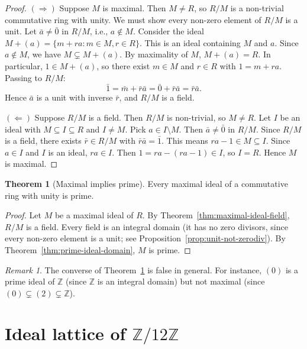 \documentclass[12pt,a4paper,openany]{book}
\theoremstyle{definition}
\newtheorem{theorem}{Theorem}[chapter]
\theoremstyle{remark}
\newtheorem{remark}{Remark}[chapter]
\begin{document}
\begin{proof}
$(\Rightarrow)$ Suppose $M$ is maximal. Then $M\neq R$, so $R/M$ is a non-trivial commutative ring with unity. We must show every non-zero element of $R/M$ is a unit. Let $\bar{a}\neq\bar{0}$ in $R/M$, i.e., $a\notin M$. Consider the ideal $M+(a)=\{m+ra : m\in M, r\in R\}$. This is an ideal containing $M$ and $a$. Since $a\notin M$, we have $M\subsetneq M+(a)$. By maximality of $M$, $M+(a)=R$. In particular, $1\in M+(a)$, so there exist $m\in M$ and $r\in R$ with $1=m+ra$. Passing to $R/M$:
\[
    \bar{1}=\bar{m}+\bar{r}\bar{a}=\bar{0}+\bar{r}\bar{a}=\bar{r}\bar{a}.
\]
Hence $\bar{a}$ is a unit with inverse $\bar{r}$, and $R/M$ is a field.

$(\Leftarrow)$ Suppose $R/M$ is a field. Then $R/M$ is non-trivial, so $M\neq R$. Let $I$ be an ideal with $M\subseteq I\subseteq R$ and $I\neq M$. Pick $a\in I\setminus M$. Then $\bar{a}\neq\bar{0}$ in $R/M$. Since $R/M$ is a field, there exists $\bar{r}\in R/M$ with $\bar{r}\bar{a}=\bar{1}$. This means $ra-1\in M\subseteq I$. Since $a\in I$ and $I$ is an ideal, $ra\in I$. Then $1=ra-(ra-1)\in I$, so $I=R$. Hence $M$ is maximal.
\end{proof}

\begin{theorem}[Maximal implies prime]\label{thm:maximal-implies-prime}
Every maximal ideal of a commutative ring with unity is prime.
\end{theorem}

\begin{proof}
Let $M$ be a maximal ideal of $R$. By Theorem~\ref{thm:maximal-ideal-field}, $R/M$ is a field. Every field is an integral domain (it has no zero divisors, since every non-zero element is a unit; see Proposition~\ref{prop:unit-not-zerodiv}). By Theorem~\ref{thm:prime-ideal-domain}, $M$ is prime.
\end{proof}

\begin{remark}\label{rem:prime-not-maximal}
The converse of Theorem~\ref{thm:maximal-implies-prime} is false in general. For instance, $(0)$ is a prime ideal of $\mathbb{Z}$ (since $\mathbb{Z}$ is an integral domain) but not maximal (since $(0)\subsetneq(2)\subsetneq\mathbb{Z}$).
\end{remark}

\section{Ideal lattice of \texorpdfstring{$\mathbb{Z}/12\mathbb{Z}$}{Z/12Z}}\label{sec:ideal-lattice}
\end{document}
